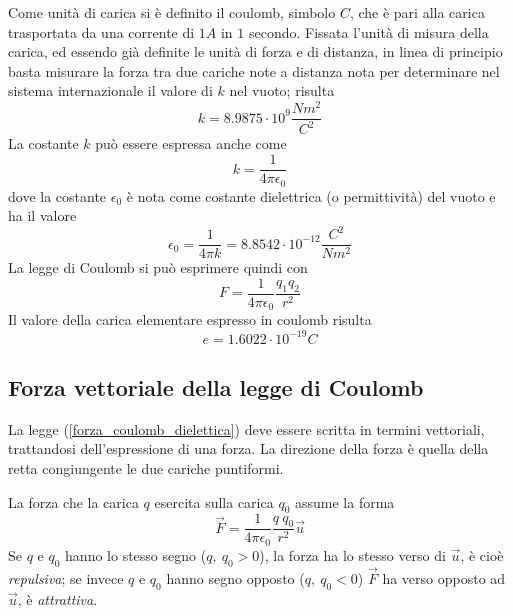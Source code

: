 \documentclass[class=book, crop=false, oneside, 12pt]{standalone}
\begin{document}
Come unità di carica si è definito il coulomb, simbolo \(C\), che è pari alla carica trasportata da una corrente di \(1 A\) in \(1\) secondo. \newline
Fissata l'unità di misura della carica, ed essendo già definite le unità di forza e di distanza, in linea di principio basta misurare la forza tra due cariche note a distanza nota per determinare nel sistema internazionale il valore di \(k\) nel vuoto; risulta
\begin{equation}
    k = 8.9875 \cdot 10^9 \frac{Nm^2}{C^2}
\end{equation}
La costante \(k\) può essere espressa anche come 
\begin{equation*}
    k = \frac{1}{4 \pi \epsilon_0}
\end{equation*}
dove la costante \(\epsilon_0\) è nota come costante dielettrica (o permittività) del vuoto e ha il valore
\begin{equation}
    \epsilon_0 = \frac{1}{4 \pi k} = 8.8542 \cdot 10^{-12} \frac{C^2}{N m^2}
\end{equation}
La legge di Coulomb si può esprimere quindi con
\begin{equation} \label{forza_coulomb_dielettica}
    F = \frac{1}{4 \pi \epsilon_0} \frac{q_1 q_2}{r^2}
\end{equation}
Il valore della carica elementare espresso in coulomb risulta 
\begin{equation}
    e = 1.6022 \cdot 10^{-19} C
\end{equation}

\subsection{Forza vettoriale della legge di Coulomb}

La legge (\ref{forza_coulomb_dielettica}) deve essere scritta in termini vettoriali, trattandosi dell'espressione di una forza.
La direzione della forza è quella della retta congiungente le due cariche puntiformi.

La forza che la carica \(q\) esercita sulla carica \(q_0\) assume la forma
\begin{equation}
    \overrightarrow{F} = \frac{1}{4 \pi \epsilon_0} \frac{q \ q_0}{r^2} \overrightarrow{u}
\end{equation}
Se \(q\) e \(q_0\) hanno lo stesso segno (\(q ,\ q_0 > 0\)), la forza ha lo stesso verso di \(\overrightarrow{u}\), è cioè \emph{repulsiva}; se invece \(q\) e \(q_0\) hanno segno opposto (\(q ,\ q_0 < 0\)) \(\overrightarrow{F}\) ha verso opposto ad \(\overrightarrow{u}\), è \emph{attrattiva}.
\end{document}
